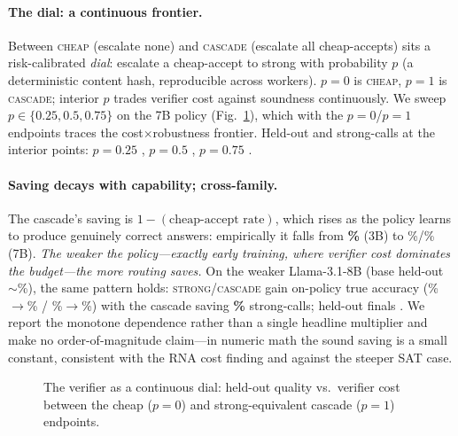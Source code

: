 \paragraph{The dial: a continuous frontier.} Between \textsc{cheap} (escalate none) and \textsc{cascade}
(escalate all cheap-accepts) sits a risk-calibrated \emph{dial}: escalate a cheap-accept to strong with
probability $p$ (a deterministic content hash, reproducible across workers). $p{=}0$ is \textsc{cheap},
$p{=}1$ is \textsc{cascade}; interior $p$ trades verifier cost against soundness continuously. We sweep
$p\in\{0.25,0.5,0.75\}$ on the 7B policy (Fig.~\ref{fig:frontier}), which with the $p{=}0$/$p{=}1$ endpoints
traces the cost$\times$robustness frontier. Held-out and strong-calls at the interior points:
$p{=}0.25$ ,
$p{=}0.5$ ,
$p{=}0.75$ .

\paragraph{Saving decays with capability; cross-family.} The cascade's saving is $1-(\text{cheap-accept
rate})$, which rises as the policy learns to produce genuinely correct answers: empirically it falls from
\textbf{\threeBSavings\%} (3B) to \mSevenBSavings\%/\longSavings\% (7B). \emph{The weaker the policy---exactly
early training, where verifier cost dominates the budget---the more routing saves.} On the weaker
Llama-3.1-8B (base held-out $\sim$\llamaStrongHoBase\%), the same pattern holds: \textsc{strong}/\textsc{cascade}
gain on-policy true accuracy (\llamaStrongAccStart\%$\to$\llamaStrongAccEnd\% /
\llamaCascadeAccStart\%$\to$\llamaCascadeAccEnd\%) with the cascade saving \textbf{\llamaSavings\%} strong-calls;
held-out finals . We report the monotone dependence rather than a
single headline multiplier and make no order-of-magnitude claim---in numeric math the sound saving is a small
constant, consistent with the RNA cost finding and against the steeper SAT case.

\begin{figure}[t]\centering
\caption{The verifier as a continuous dial: held-out quality vs.\ verifier cost between the cheap ($p{=}0$)
and strong-equivalent cascade ($p{=}1$) endpoints.}\label{fig:frontier}
\end{figure}

